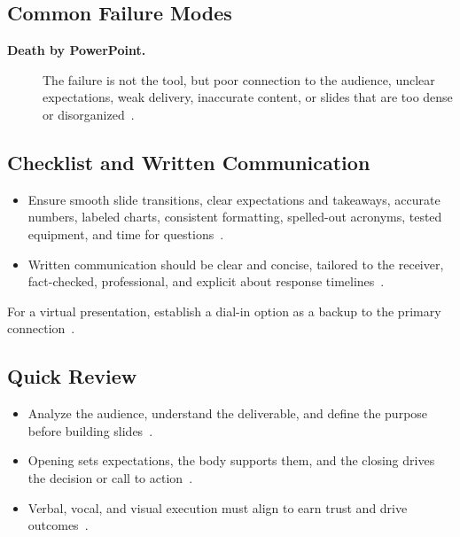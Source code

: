 \documentclass[../main.tex]{subfiles}
\begin{document}
\subsection{Common Failure Modes}
\begin{description}
  \item[\textbf{Death by PowerPoint.}] The failure is not the tool, but poor connection to the audience, unclear expectations, weak delivery, inaccurate content, or slides that are too dense or disorganized~\autocite{edo-5-1-4-presentation-techniques-2025}.
\end{description}

\subsection{Checklist and Written Communication}
\begin{itemize}
  \item Ensure smooth slide transitions, clear expectations and takeaways, accurate numbers, labeled charts, consistent formatting, spelled-out acronyms, tested equipment, and time for questions~\autocite{edo-5-1-4-presentation-techniques-2025}.
  \item Written communication should be clear and concise, tailored to the receiver, fact-checked, professional, and explicit about response timelines~\autocite{edo-5-1-4-presentation-techniques-2025}.
\end{itemize}

\noindent For a virtual presentation, establish a dial-in option as a backup to the primary connection~\autocite{edo-5-1-4-presentation-techniques-2025}.

\subsection{Quick Review}
\begin{itemize}
  \item Analyze the audience, understand the deliverable, and define the purpose before building slides~\autocite{edo-5-1-4-presentation-techniques-2025}.
  \item Opening sets expectations, the body supports them, and the closing drives the decision or call to action~\autocite{edo-5-1-4-presentation-techniques-2025}.
  \item Verbal, vocal, and visual execution must align to earn trust and drive outcomes~\autocite{edo-5-1-4-presentation-techniques-2025}.
\end{itemize}

\end{document}
